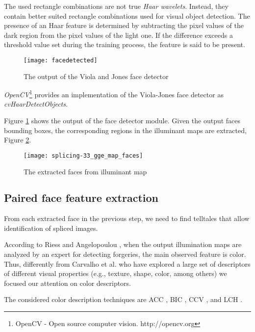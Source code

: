 The used rectangle combinations are not true \emph{Haar wavelets}\cite{haar1910theorie}. Instead, they contain better suited rectangle combinations used for visual object detection. The presence of an Haar feature is determined by subtracting the pixel values of the dark region from the pixel values of the light one. If the difference exceeds a threshold value set during the training process, the feature is said to be present. 

\begin{figure}[h!]
  \centering
    \texttt{[image: facedetected]}
    \caption{The output of the Viola and Jones face detector}
    \label{fig:facesdetected}
\end{figure}

\emph{OpenCV}\footnote{OpenCV - Open source computer vision. http://opencv.org} provides an implementation of the Viola-Jones face detector as \emph{cvHaarDetectObjects}.

Figure \ref{fig:facesdetected} shows the output of the face detector module. Given the output faces bounding boxes, the corresponding regions in the illuminant maps are extracted, Figure \ref{fig:facesdetectedmaps}.

\begin{figure}[h!]
  \centering
    \texttt{[image: splicing-33\_gge\_map\_faces]}
    \caption{The extracted faces from illuminant map}
    \label{fig:facesdetectedmaps}
\end{figure}

\subsection{Paired face feature extraction}

From each extracted face in the previous step, we need to find telltales that allow identification of spliced images. 

According to Riess and Angelopoulou \cite{riess2010scene}, when the output illumination maps are analyzed by an expert for detecting forgeries, the main observed feature is color. Thus, differently from Carvalho et al. \cite{carvalho2016illuminant} who have explored a large set of descriptors of different visual properties (e.g., texture, shape, color, among others) we focused our attention on color descriptors.

The considered color description techniques are ACC \cite{huang1997image}, BIC \cite{stehling2002compact}, CCV \cite{pass1997comparing}, and LCH \cite{swain1991color}.

